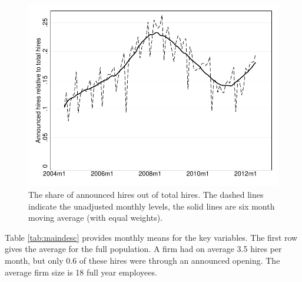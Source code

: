 \documentclass[11pt,article]{memoir}
\begin{document}
\begin{figure}[h]
\begin{center}
		\includegraphics[width=.98\linewidth]{figures/overview_rate_HAHT}
	\caption{The share of announced hires out of total hires. The dashed lines indicate the unadjusted monthly levels, the solid lines are six month moving average (with equal weights). }
	\label{fig:hires_shares}
\end{center}
\end{figure}

Table \ref{tab:maindesc} provides monthly means for the key variables. The first row gives the average for the full population. A firm had on average 3.5 hires per month, but only 0.6 of these hires were through an announced opening. The average firm size is 18 full year employees. 

\end{document}
